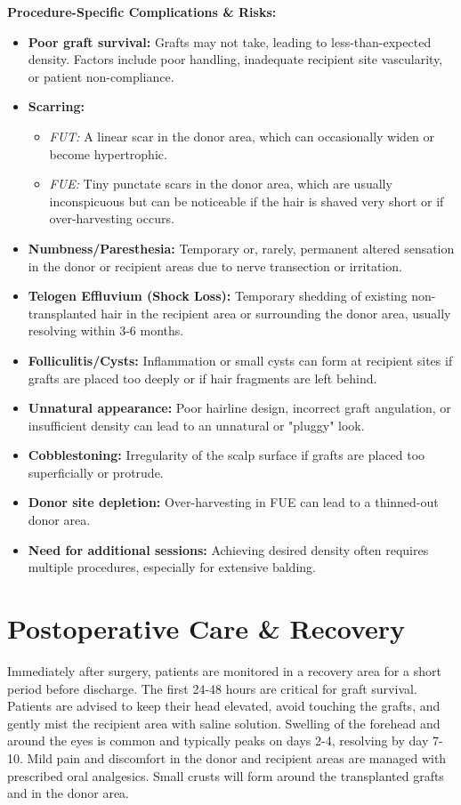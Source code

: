 \textbf{Procedure-Specific Complications \& Risks:}
\begin{itemize}
  \item \textbf{Poor graft survival:} Grafts may not take, leading to less-than-expected density. Factors include poor handling, inadequate recipient site vascularity, or patient non-compliance.
  \item \textbf{Scarring:}
    \begin{itemize}
      \item \textit{FUT:} A linear scar in the donor area, which can occasionally widen or become hypertrophic.
      \item \textit{FUE:} Tiny punctate scars in the donor area, which are usually inconspicuous but can be noticeable if the hair is shaved very short or if over-harvesting occurs.
    \end{itemize}
  \item \textbf{Numbness/Paresthesia:} Temporary or, rarely, permanent altered sensation in the donor or recipient areas due to nerve transection or irritation.
  \item \textbf{Telogen Effluvium (Shock Loss):} Temporary shedding of existing non-transplanted hair in the recipient area or surrounding the donor area, usually resolving within 3-6 months.
  \item \textbf{Folliculitis/Cysts:} Inflammation or small cysts can form at recipient sites if grafts are placed too deeply or if hair fragments are left behind.
  \item \textbf{Unnatural appearance:} Poor hairline design, incorrect graft angulation, or insufficient density can lead to an unnatural or "pluggy" look.
  \item \textbf{Cobblestoning:} Irregularity of the scalp surface if grafts are placed too superficially or protrude.
  \item \textbf{Donor site depletion:} Over-harvesting in FUE can lead to a thinned-out donor area.
  \item \textbf{Need for additional sessions:} Achieving desired density often requires multiple procedures, especially for extensive balding.
\end{itemize}

\section*{Postoperative Care \& Recovery}
Immediately after surgery, patients are monitored in a recovery area for a short period before discharge. The first 24-48 hours are critical for graft survival. Patients are advised to keep their head elevated, avoid touching the grafts, and gently mist the recipient area with saline solution. Swelling of the forehead and around the eyes is common and typically peaks on days 2-4, resolving by day 7-10. Mild pain and discomfort in the donor and recipient areas are managed with prescribed oral analgesics. Small crusts will form around the transplanted grafts and in the donor area.

